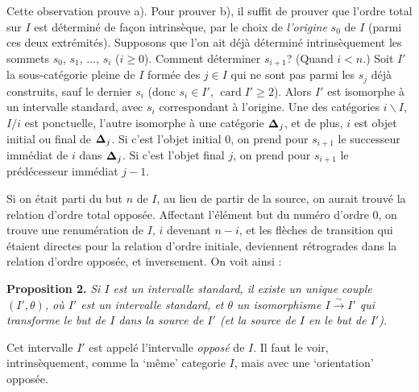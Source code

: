 Cette observation prouve a). Pour prouver b), il suffit de prouver que l'ordre total sur $I$ est déterminé de façon intrinsèque, par le choix de \textit{l'origine} $s_0$ de $I$ (parmi ces %
deux extrémités). Supposons que l'on ait déjà déterminé intrinsèquement les sommets $s_0$, $s_1$, $\ldots$, $s_i$ ($i \geq 0$). Comment déterminer $s_{i+1}$? (Quand $i < n$.) Soit $I'$ la sous-catégorie pleine de $I$
formée des $j \in I$ qui ne sont pas parmi les $s_j$ déjà construits, sauf le dernier $s_i$ (donc $s_i \in I'$, $\operatorname{card} I' \geq 2$). Alors $I'$ est isomorphe à un intervalle standard, avec $s_i$ correspondant à l'origine. Une des catégories $i\backslash I$, $I/i$ est ponctuelle, l'autre isomorphe à une catégorie $\boldsymbol{\Delta}_j$, et de plus, $i$ est objet initial ou final de $\boldsymbol{\Delta}_j$. Si c'est l'objet initial $0$, on prend pour $s_{i+1}$ le successeur immédiat de $i$ dans $\boldsymbol{\Delta}_j$. Si c'est l'objet final $j$, on prend pour $s_{i+1}$ le prédécesseur immédiat $j-1$.

Si on était parti du but $n$ de $I$, au lieu de partir de la source, on aurait trouvé la relation d'ordre total opposée. Affectant l'élément but du numéro d'ordre $0$, on trouve une renumération de $I$, $i$ devenant $n-i$, et les flèches de transition qui étaient directes pour la relation d'ordre initiale, deviennent rétrogrades dans la relation d'ordre opposée, et inversement. On voit ainsi :

\textbf{Proposition 2.} \textit{Si $I$ est un intervalle standard, il existe un unique couple $(I',\theta)$, où $I'$ est un intervalle standard, et $\theta$ un isomorphisme $I \xrightarrow{\sim} I'$ qui transforme le but de $I$ dans la source de $I'$ (et la source de $I$ en le but de $I'$).}

Cet intervalle $I'$ est appelé l'intervalle \textit{opposé} de $I$. Il faut le voir, intrinsèquement, comme la `même' categorie $I$, %
mais avec une `orientation' opposée.


